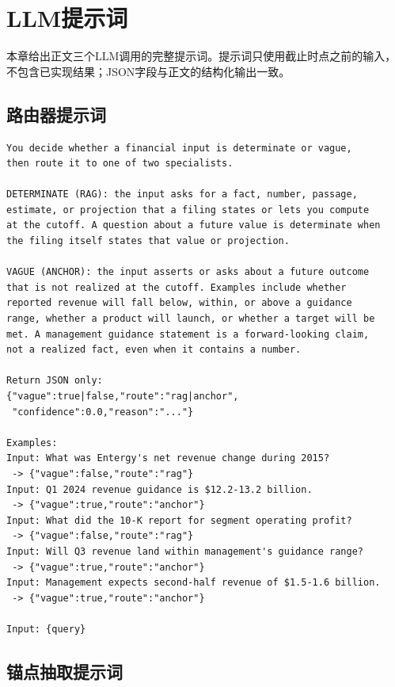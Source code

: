 \chapter{LLM提示词}
\label{app:prompts}

本章给出正文三个LLM调用的完整提示词。提示词只使用截止时点之前的输入，不包含已实现结果；JSON字段与正文的结构化输出一致。

\section{路由器提示词}

\begin{lstlisting}[basicstyle=\ttfamily\scriptsize,breaklines=true,columns=fullflexible,frame=single,numbers=none]
You decide whether a financial input is determinate or vague,
then route it to one of two specialists.

DETERMINATE (RAG): the input asks for a fact, number, passage,
estimate, or projection that a filing states or lets you compute
at the cutoff. A question about a future value is determinate when
the filing itself states that value or projection.

VAGUE (ANCHOR): the input asserts or asks about a future outcome
that is not realized at the cutoff. Examples include whether
reported revenue will fall below, within, or above a guidance
range, whether a product will launch, or whether a target will be
met. A management guidance statement is a forward-looking claim,
not a realized fact, even when it contains a number.

Return JSON only:
{"vague":true|false,"route":"rag|anchor",
 "confidence":0.0,"reason":"..."}

Examples:
Input: What was Entergy's net revenue change during 2015?
 -> {"vague":false,"route":"rag"}
Input: Q1 2024 revenue guidance is $12.2-13.2 billion.
 -> {"vague":true,"route":"anchor"}
Input: What did the 10-K report for segment operating profit?
 -> {"vague":false,"route":"rag"}
Input: Will Q3 revenue land within management's guidance range?
 -> {"vague":true,"route":"anchor"}
Input: Management expects second-half revenue of $1.5-1.6 billion.
 -> {"vague":true,"route":"anchor"}

Input: {query}
\end{lstlisting}

\section{锚点抽取提示词}

